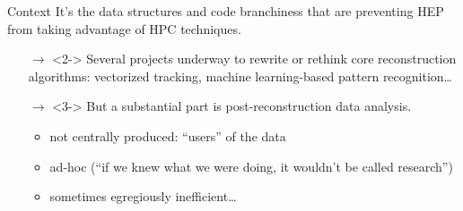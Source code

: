 \documentclass[aspectratio=169]{beamer}
\begin{document}
\begin{frame}{Context}
\vspace{0.5 cm}
It's the data structures and code branchiness that are preventing HEP from taking advantage of HPC techniques.

\vspace{0.25 cm}
\begin{itemize}\setlength{\itemsep}{0.5 cm}
\item[$\rightarrow$]<2-> Several projects underway to rewrite or rethink core reconstruction algorithms: vectorized tracking, machine learning-based pattern recognition\ldots

\item[$\rightarrow$]<3-> But a substantial part is post-reconstruction data analysis.
\begin{itemize}\setlength{\itemsep}{0.1 cm}
\item<4-> not centrally produced: ``users'' of the data
\item<5-> ad-hoc (``if we knew what we were doing, it wouldn't be called research'')
\item<6-> sometimes egregiously inefficient\ldots
\end{itemize}
\end{itemize}
\end{frame}
\end{document}

